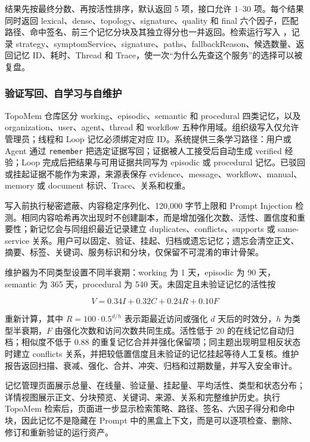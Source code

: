 \documentclass[conference,10pt]{IEEEtran}
\newcommand{\code}[1]{\texttt{#1}}
\newcommand{\filepath}[1]{\path{#1}}
\begin{document}
结果先按最终分数、再按活性排序，默认返回 5 项，接口允许 1--30 项。每个结果同时返回 lexical、dense、topology、signature、quality 和 final 六个因子，匹配路径、命中签名、前三个记忆分块及其独立得分也一并返回。检索运行写入 \filepath{scry\_memory\_retrieval\_runs}，记录 strategy、symptomService、signature、paths、fallbackReason、候选数量、返回记忆 ID、耗时、Thread 和 Trace，使一次“为什么先查这个服务”的选择可以被复盘。

\subsubsection{验证写回、自学习与自维护}

TopoMem 仓库区分 working、episodic、semantic 和 procedural 四类记忆，以及 organization、user、agent、thread 和 workflow 五种作用域。组织级写入仅允许管理员；线程和 Loop 记忆必须绑定对应 ID。系统提供三条学习路径：用户或 Agent 通过 \code{remember} 把选定证据写回；证据被人工接受后自动生成 verified 经验；Loop 完成后把结果与可用证据共同写为 episodic 或 procedural 记忆。已驳回或挂起证据不能作为来源，来源表保存 evidence、message、workflow、manual、memory 或 document 标识、Trace、关系和权重。

写入前执行秘密遮蔽、内容稳定序列化、120,000 字节上限和 Prompt Injection 检测。相同内容哈希再次出现时不创建副本，而是增加强化次数、活性、置信度和重要性；新记忆会与同组织最近记录建立 duplicates、conflicts、supports 或 same-service 关系。用户可以固定、验证、挂起、归档或遗忘记忆；遗忘会清空正文、摘要、标签、关键词、服务标识和分块，仅保留不可混淆的审计骨架。

维护器为不同类型设置不同半衰期：working 为 1 天，episodic 为 90 天，semantic 为 365 天，procedural 为 540 天。未固定且未验证记忆的活性按

\begin{equation}
  V=0.34I+0.32C+0.24R+0.10F
\end{equation}

重新计算，其中 $R=100\cdot0.5^{d/h}$ 表示距最近访问或强化 $d$ 天后的时效分，$h$ 为类型半衰期，$F$ 由强化次数和访问次数共同生成。活性低于 20 的在线记忆自动归档；相似度不低于 0.88 的重复记忆合并并强化保留项；同主题出现明显相反状态时建立 conflicts 关系，并把较低置信度且未验证的记忆挂起等待人工复核。维护报告返回扫描、衰减、强化、合并、冲突、归档和过期数量，并写入安全审计。

记忆管理页面展示总量、在线量、验证量、挂起量、平均活性、类型和状态分布；详情视图展示正文、分块预览、关键词、来源、关系和完整维护历史。执行 TopoMem 检索后，页面进一步显示检索策略、路径、签名、六因子得分和命中块，因此记忆不是隐藏在 Prompt 中的黑盒上下文，而是可以逐项检查、删除、修订和重新验证的运行资产。
\end{document}
